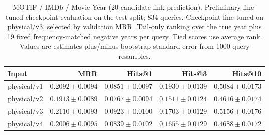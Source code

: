 \begin{table}[t]
\centering
\small
\begin{tabular}{lrrrr}
\toprule
Input & MRR & Hits@1 & Hits@3 & Hits@10 \\
\midrule
physical/v1 & $0.2092 \pm 0.0094$ & $0.0851 \pm 0.0097$ & $0.1930 \pm 0.0139$ & $0.5084 \pm 0.0173$ \\
physical/v2 & $0.1913 \pm 0.0089$ & $0.0767 \pm 0.0094$ & $0.1511 \pm 0.0124$ & $0.4616 \pm 0.0174$ \\
physical/v3 & $0.2110 \pm 0.0093$ & $0.0923 \pm 0.0100$ & $0.1703 \pm 0.0129$ & $0.5156 \pm 0.0176$ \\
physical/v4 & $0.2006 \pm 0.0095$ & $0.0839 \pm 0.0102$ & $0.1655 \pm 0.0129$ & $0.4688 \pm 0.0172$ \\
\bottomrule
\end{tabular}
\caption{MOTIF / IMDb / Movie-Year (20-candidate link prediction). Preliminary fine-tuned checkpoint evaluation on the test split; 834 queries. Checkpoint fine-tuned on physical/v3, selected by validation MRR. Tail-only ranking over the true year plus 19 fixed frequency-matched negative years per query. Tied scores use average rank. Values are estimates plus/minus bootstrap standard error from 1000 query resamples.}
\label{tab:motif-movie_year-link_prediction}
\end{table}
